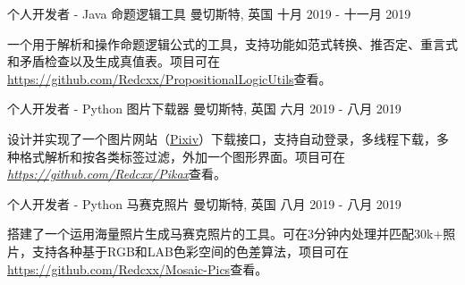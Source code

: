 \begin{cventries}


  \cventry
    {个人开发者 - Java} %
    {命题逻辑工具} %
    {曼切斯特, 英国} %
    {十月 2019 - 十一月 2019} %
    {
      \begin{cvitems} %
        \item {一个用于解析和操作命题逻辑公式的工具，支持功能如范式转换、推否定、重言式和矛盾检查以及生成真值表。项目可在\href{https://github.com/Redcxx/PropositionalLogicUtils}{https://github.com/Redcxx/PropositionalLogicUtils}查看。}
      \end{cvitems}
    }

  \cventry
    {个人开发者 - Python} %
    {图片下载器} %
    {曼切斯特, 英国} %
    {六月 2019 - 八月 2019} %
    {
      \begin{cvitems} %
        \item {设计并实现了一个图片网站（\href{https://www.pixiv.net/}{Pixiv}）下载接口，支持自动登录，多线程下载，多种格式解析和按各类标签过滤，外加一个图形界面。项目可在 \href{https://github.com/Redcxx/Pikax}{\textit{https://github.com/Redcxx/Pikax}}查看。}
      \end{cvitems}
    }

  \cventry
    {个人开发者 - Python} %
    {马赛克照片} %
    {曼切斯特, 英国} %
    {八月 2019 - 八月 2019} %
    {
      \begin{cvitems} %
        \item {搭建了一个运用海量照片生成马赛克照片的工具。可在3分钟内处理并匹配30k+照片，支持各种基于RGB和LAB色彩空间的色差算法，项目可在\href{https://github.com/Redcxx/Mosaic-Pics}{https://github.com/Redcxx/Mosaic-Pics}查看。}
      \end{cvitems}
    }


\end{cventries}
